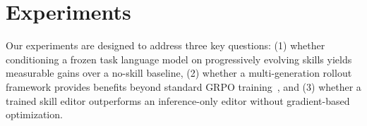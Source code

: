\section{Experiments}
\label{sec:experiments}

Our experiments are designed to address three key questions: (1) whether conditioning a frozen task language model on progressively evolving skills yields measurable gains over a no-skill baseline, (2) whether a multi-generation rollout framework provides benefits beyond standard GRPO training~\citep{shao2024deepseekmath}, and (3) whether a trained skill editor outperforms an inference-only editor without gradient-based optimization. 


